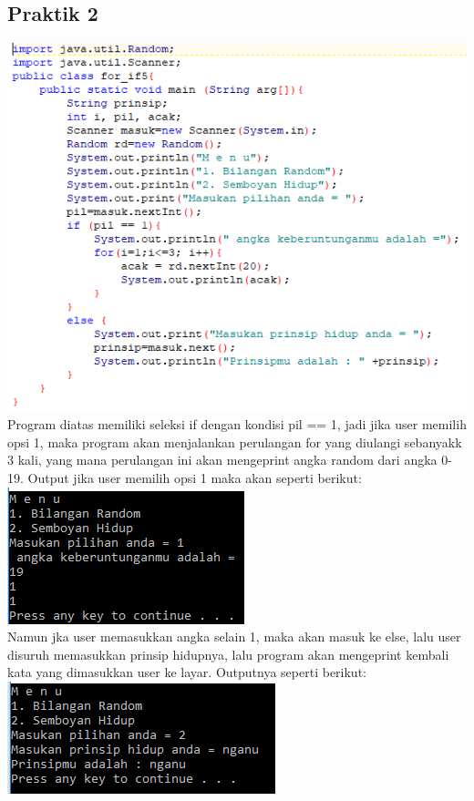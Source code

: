 \documentclass[a4paper,12pt]{article}
\begin{document}
\subsection{Praktik 2}
\includegraphics{img7.PNG}\\
Program diatas memiliki seleksi if dengan kondisi pil == 1, jadi jika user memilih opsi 1, maka program akan menjalankan perulangan for yang diulangi sebanyakk 3 kali, yang mana perulangan ini akan mengeprint angka random dari angka 0-19. Output jika user memilih opsi 1 maka akan seperti berikut:\\
\includegraphics{img8.PNG}\\
Namun jka user memasukkan angka selain 1, maka akan masuk ke else, lalu user disuruh memasukkan prinsip hidupnya, lalu program akan mengeprint kembali kata yang dimasukkan user ke layar. Outputnya seperti berikut:\\
\includegraphics{img9.PNG}
\end{document}
